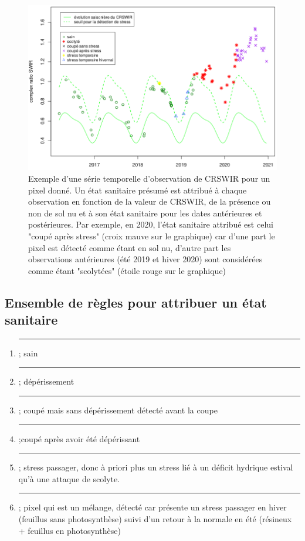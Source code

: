\documentclass[a4paper, 12pt]{article} %
\newcommand\crule[3][black]{\textcolor{#1}{\rule{#2}{#3}}}
\begin{document}
\begin{figure}[H]
	\centering
	\includegraphics[width=0.9\linewidth]{illuArbreCoupe.png}
	\caption{Exemple d'une série temporelle d'observation de CRSWIR pour un pixel donné. Un état sanitaire présumé est attribué à chaque observation en fonction de la valeur de CRSWIR, de la présence ou non de sol nu et à son état sanitaire pour les dates antérieures et postérieures. Par exemple, en 2020, l'état sanitaire attribué est celui "coupé après stress" (croix mauve sur le graphique) car d'une part le pixel est détecté comme étant en sol nu, d'autre part les observations antérieures (été 2019 et hiver 2020) sont considérées comme étant "scolytées" (étoile rouge sur le graphique) }
	\label{fig:ex}
\end{figure}

\subsection{Ensemble de règles pour attribuer un état sanitaire}

\begin{enumerate}

	\item \crule[cl1]{1cm}{1cm} ; sain 

	\item \crule[cl2]{1cm}{1cm} ; dépérissement 

	\item \crule[cl3]{1cm}{1cm} ; coupé mais sans dépérissement détecté avant la coupe 

	\item  \crule[cl4]{1cm}{1cm} ;coupé après avoir été dépérissant
	\item \crule[cl5]{1cm}{1cm} ; stress passager, donc à priori plus un stress lié à un déficit hydrique estival qu'à une attaque de scolyte. 
	\item \crule[cl6]{1cm}{1cm} ; pixel qui est un mélange, détecté car présente un stress passager en hiver (feuillus sans photosynthèse) suivi d'un retour à la normale en été (résineux + feuillus en photosynthèse) 
\end{enumerate}
\end{document}
